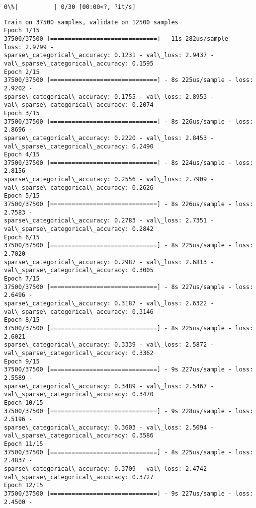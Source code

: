\documentclass[11pt]{article}
\begin{document}
    \begin{Verbatim}[commandchars=\\\{\}]
  0\%|          | 0/30 [00:00<?, ?it/s]
    \end{Verbatim}

    \begin{Verbatim}[commandchars=\\\{\}]
Train on 37500 samples, validate on 12500 samples
Epoch 1/15
37500/37500 [==============================] - 11s 282us/sample - loss: 2.9799 -
sparse\_categorical\_accuracy: 0.1231 - val\_loss: 2.9437 -
val\_sparse\_categorical\_accuracy: 0.1595
Epoch 2/15
37500/37500 [==============================] - 8s 225us/sample - loss: 2.9202 -
sparse\_categorical\_accuracy: 0.1755 - val\_loss: 2.8953 -
val\_sparse\_categorical\_accuracy: 0.2074
Epoch 3/15
37500/37500 [==============================] - 8s 226us/sample - loss: 2.8696 -
sparse\_categorical\_accuracy: 0.2220 - val\_loss: 2.8453 -
val\_sparse\_categorical\_accuracy: 0.2490
Epoch 4/15
37500/37500 [==============================] - 8s 224us/sample - loss: 2.8156 -
sparse\_categorical\_accuracy: 0.2556 - val\_loss: 2.7909 -
val\_sparse\_categorical\_accuracy: 0.2626
Epoch 5/15
37500/37500 [==============================] - 8s 226us/sample - loss: 2.7583 -
sparse\_categorical\_accuracy: 0.2783 - val\_loss: 2.7351 -
val\_sparse\_categorical\_accuracy: 0.2842
Epoch 6/15
37500/37500 [==============================] - 8s 225us/sample - loss: 2.7020 -
sparse\_categorical\_accuracy: 0.2987 - val\_loss: 2.6813 -
val\_sparse\_categorical\_accuracy: 0.3005
Epoch 7/15
37500/37500 [==============================] - 8s 227us/sample - loss: 2.6496 -
sparse\_categorical\_accuracy: 0.3187 - val\_loss: 2.6322 -
val\_sparse\_categorical\_accuracy: 0.3146
Epoch 8/15
37500/37500 [==============================] - 8s 225us/sample - loss: 2.6021 -
sparse\_categorical\_accuracy: 0.3339 - val\_loss: 2.5872 -
val\_sparse\_categorical\_accuracy: 0.3362
Epoch 9/15
37500/37500 [==============================] - 9s 227us/sample - loss: 2.5589 -
sparse\_categorical\_accuracy: 0.3489 - val\_loss: 2.5467 -
val\_sparse\_categorical\_accuracy: 0.3470
Epoch 10/15
37500/37500 [==============================] - 9s 228us/sample - loss: 2.5196 -
sparse\_categorical\_accuracy: 0.3603 - val\_loss: 2.5094 -
val\_sparse\_categorical\_accuracy: 0.3586
Epoch 11/15
37500/37500 [==============================] - 8s 225us/sample - loss: 2.4837 -
sparse\_categorical\_accuracy: 0.3709 - val\_loss: 2.4742 -
val\_sparse\_categorical\_accuracy: 0.3727
Epoch 12/15
37500/37500 [==============================] - 9s 227us/sample - loss: 2.4500 -

\end{Verbatim}
\end{document}
